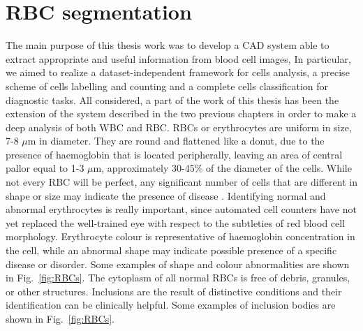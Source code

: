\documentclass[final,a4paper,12pt,english]{UnicaPhdThesis3}
\begin{document}
\section{RBC segmentation}
The main purpose of this thesis work was to develop a CAD system able to extract appropriate and useful information from blood cell images, In particular, we aimed to realize a dataset-independent framework for cells analysis, a precise scheme of cells labelling and counting and a complete cells classification for diagnostic tasks. All considered, a part of the work of this thesis has been the extension of the system described in the two previous chapters in order to make a deep analysis of both WBC and RBC.
RBCs or erythrocytes are uniform in size, 7-8 $\mu$m in diameter. They are round and flattened like a donut, due to the presence of haemoglobin that is located peripherally, leaving an area of central pallor equal to 1-3 $\mu$m, approximately 30-45\% of the diameter of the cells. While not every RBC will be perfect, any significant number of cells that are different in shape or size may indicate the presence of disease \cite{Erhabor}. Identifying normal and abnormal erythrocytes is really important, since automated cell counters have not yet replaced the well-trained eye with respect to the subtleties of red blood cell morphology. Erythrocyte colour is representative of haemoglobin concentration in the cell, while an abnormal shape may indicate possible presence of a specific disease or disorder. Some examples of shape and colour abnormalities are shown in Fig.~\ref{fig:RBCs}. The cytoplasm of all normal RBCs is free of debris, granules, or other structures. Inclusions are the result of distinctive conditions and their identification can be clinically helpful. Some examples of inclusion bodies are shown in Fig.~\ref{fig:RBCs}.
\end{document}
